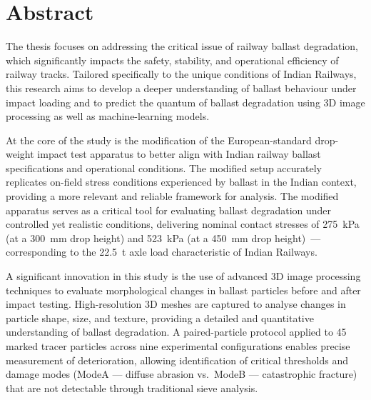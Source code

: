 \chapter*{Abstract}
\thispagestyle{plain}

\begingroup
\setlength{\parindent}{0pt}

The thesis focuses on addressing the critical issue of railway ballast
degradation, which significantly impacts the safety, stability, and
operational efficiency of railway tracks. Tailored specifically to the unique
conditions of Indian Railways, this research aims to develop a deeper
understanding of ballast behaviour under impact loading and to predict the
quantum of ballast degradation using 3D image processing as well as
machine-learning models.

\bigskip

At the core of the study is the modification of the European-standard
drop-weight impact test apparatus to better align with Indian railway
ballast specifications and operational conditions. The modified setup
accurately replicates on-field stress conditions experienced by ballast in
the Indian context, providing a more relevant and reliable framework for
analysis. The modified apparatus serves as a critical tool for evaluating
ballast degradation under controlled yet realistic conditions, delivering
nominal contact stresses of \SI{275}{\kilo\pascal} (at a
\SI{300}{\milli\metre} drop height) and \SI{523}{\kilo\pascal} (at a
\SI{450}{\milli\metre} drop height)~--- corresponding to the
\SI{22.5}{\tonne} axle load characteristic of Indian Railways.

\bigskip

A significant innovation in this study is the use of advanced 3D image
processing techniques to evaluate morphological changes in ballast particles
before and after impact testing. High-resolution 3D meshes are captured to
analyse changes in particle shape, size, and texture, providing a detailed
and quantitative understanding of ballast degradation. A paired-particle
protocol applied to 45 marked tracer particles across nine experimental
configurations enables precise measurement of deterioration, allowing
identification of critical thresholds and damage modes (\gls{ModeA} --- diffuse
abrasion vs.\ \gls{ModeB} --- catastrophic fracture) that are not detectable
through traditional sieve analysis.

